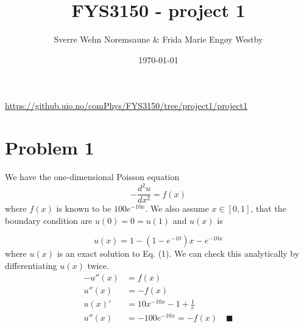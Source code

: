 \documentclass[english,notitlepage]{revtex4-1}  %
\begin{document}
\title{FYS3150 - project 1}      %
\author{Sverre Wehn Noremsaune \& Frida Marie Engøy Westby}          %
\date{\today}                             %
\noaffiliation                            %


\maketitle 

\begin{center}
	\url{https://github.uio.no/comPhys/FYS3150/tree/project1/project1}
\end{center}

    
\section*{Problem 1}

We have the one-dimensional Poisson equation
\begin{equation}\label{eq:one-dimensional Poisson}
    - \frac{d^2u}{dx^2} = f(x)
\end{equation}
where $f(x)$ is known to be $100e^{-10x}$. We also assume $x \in [0,1]$, that the boundary condition are $u(0) = 0 = u(1)$ and $u(x)$ is

\begin{equation}\label{eq:exact solution one-dimensional Poisson}
    u(x) = 1 - (1 - e^{-10})x-e^{-10x}
\end{equation}
where $u(x)$ is an exact solution to Eq. (1). We can check this analytically by differentiating $u(x)$ twice.
\begin{equation*}
    \begin{split}
    	-u''(x) &= f(x) \\
    	u''(x) &= -f(x) \\
        u(x)' &= 10x^{-10x} - 1 + \frac{1}{e} \\
        u''(x) &= -100e^{-10x}= -f(x) \quad \blacksquare
    \end{split}
\end{equation*}


\end{document}
